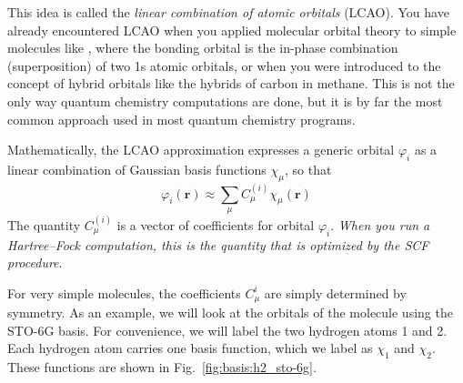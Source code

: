 \documentclass[../Main/notes.tex]{subfiles}
\begin{document}
This idea is called the \emph{linear combination of atomic orbitals} (LCAO).
You have already encountered LCAO when you applied molecular orbital theory to simple molecules like , where the bonding orbital is the in-phase combination (superposition) of two 1s atomic orbitals, or when you were introduced to the concept of hybrid orbitals like the  hybrids of carbon in methane.
This is not the only way quantum chemistry computations are done, but it is by far the most common approach used in most quantum chemistry programs.

Mathematically, the LCAO approximation expresses a generic orbital $\varphi_i$ as a linear combination of Gaussian basis functions $\chi_\mu$, so that
\begin{equation} \label{eq:basis:orb}
\varphi_i(\mathbf{r}) \approx \sum_\mu C_{\mu}^{(i)}\chi_\mu(\mathbf{r})
\end{equation}
The quantity $C_{\mu}^{(i)}$ is a vector of coefficients for orbital $\varphi_i$.
\emph{When you run a Hartree--Fock computation, this is the quantity that is optimized by the SCF procedure}.

For very simple molecules, the coefficients $C_{\mu}^i$ are simply determined by symmetry.
As an example, we will look at the orbitals of the  molecule using the STO-6G basis.
For convenience, we will label the two hydrogen atoms 1 and 2.
Each hydrogen atom carries one basis function, which we label as $\chi_1$ and $\chi_2$. These functions are shown in Fig.~\ref{fig:basis:h2_sto-6g}.	
\end{document}
